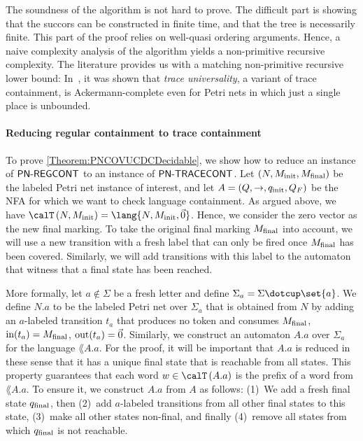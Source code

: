\documentclass[../../diss.tex]{subfiles}
\begin{document}
The soundness of the algorithm is not hard to prove.
The difficult part is showing that the succors can be constructed in finite time, and that the tree is necessarily finite.
This part of the proof relies on well-quasi ordering arguments.
Hence, a naive complexity analysis of the algorithm yields a non-primitive recursive complexity.
The literature provides us with a matching non-primitive recursive lower bound:
In~\cite{HofmanT18}, it was shown that \emph{trace universality}, a variant of trace containment, is Ackermann-complete even for Petri nets in which just a single place is unbounded.

\paragraph{Reducing regular containment to trace containment}

To prove \cref{Theorem:PNCOVUCDCDecidable}, we show how to reduce an instance of $\mathsf{PN\text{-}REGCONT}$ to an instance of $\mathsf{PN\text{-}TRACECONT}$.
Let $(N,M_{\text{init}},M_{\text{final}})$ be the labeled Petri net instance of interest, and let $A = (Q,\to,q_{\text{init}},Q_F)$ be the NFA for which we want to check language containment.
As argued above, we have $\Traces{N,\Minit} = \lang{N,\Minit,\vec{0}}$.
Hence, we consider the zero vector as the new final marking.
To take the original final marking $M_{\text{final}}$ into account, we will use a new transition with a fresh label that can only be fired once $M_{\text{final}}$ has been covered.
Similarly, we will add transitions with this label to the automaton that witness that a final state has been reached.

More formally, let $a \not\in \Sigma$ be a fresh letter and define $\Sigma_a = \Sigma \dotcup \set{a}$.
We define $N.a$ to be the labeled Petri net over $\Sigma_a$ that is obtained from $N$ by adding an $a$-labeled transition $t_a$ that produces no token and consumes $M_{\text{final}}$, \ie $\text{in}(t_a) = M_{\text{final}}$, $\text{out}(t_a) = \vec{0}$.
Similarly, we construct an automaton $A.a$ over $\Sigma_a$ for the language $\lang{A}.a$.
For the proof, it will be important that $A.a$ is reduced in these sense that it has a unique final state that is reachable from all states.
This property guarantees that each word $w \in \Traces{A.a}$ is the prefix of a word from $\lang{A.a}$.
To ensure it, we construct $A.a$ from $A$ as follows:
(1)~We add a fresh final state $q_{\text{final}}$, then (2)~add $a$-labeled transitions from all other final states to this state, (3)~make all other states non-final, and finally (4)~remove all states from which $q_{\text{final}}$ is not reachable.
\end{document}
